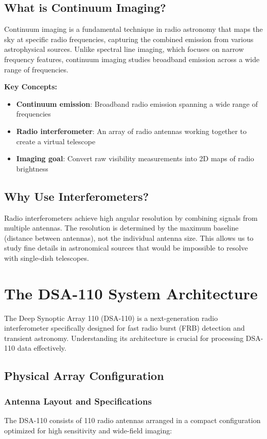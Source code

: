 \documentclass[11pt]{article}
\begin{document}
\subsection{What is Continuum Imaging?}
Continuum imaging is a fundamental technique in radio astronomy that maps the sky at specific radio frequencies, capturing the combined emission from various astrophysical sources. Unlike spectral line imaging, which focuses on narrow frequency features, continuum imaging studies broadband emission across a wide range of frequencies.

\textbf{Key Concepts:}
\begin{itemize}
    \item \textbf{Continuum emission}: Broadband radio emission spanning a wide range of frequencies
    \item \textbf{Radio interferometer}: An array of radio antennas working together to create a virtual telescope
    \item \textbf{Imaging goal}: Convert raw visibility measurements into 2D maps of radio brightness
\end{itemize}

\subsection{Why Use Interferometers?}
Radio interferometers achieve high angular resolution by combining signals from multiple antennas. The resolution is determined by the maximum baseline (distance between antennas), not the individual antenna size. This allows us to study fine details in astronomical sources that would be impossible to resolve with single-dish telescopes.

\section{The DSA-110 System Architecture}

The Deep Synoptic Array 110 (DSA-110) is a next-generation radio interferometer specifically designed for fast radio burst (FRB) detection and transient astronomy. Understanding its architecture is crucial for processing DSA-110 data effectively.

\subsection{Physical Array Configuration}

\subsubsection{Antenna Layout and Specifications}
The DSA-110 consists of 110 radio antennas arranged in a compact configuration optimized for high sensitivity and wide-field imaging:
\end{document}
